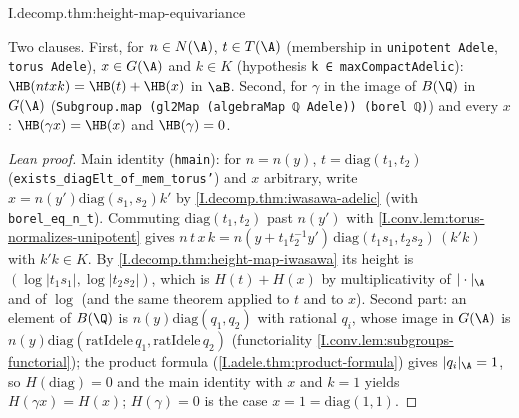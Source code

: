 \begin{theorem}
\end{theorem}
\begin{tfformal}{I.decomp.thm:height-map-equivariance}
\begin{tffidelity}
Two clauses. First, for $n\in N(\A)$, $t\in T(\A)$ (membership in \texttt{unipotent Adele}, \texttt{torus Adele}), $x\in G(\A)$ and $k\in K$ (hypothesis \texttt{k ∈ maxCompactAdelic}): $\HB(ntxk)=\HB(t)+\HB(x)$ in $\aB$. Second, for $\gamma$ in the image of $B(\Q)$ in $G(\A)$ (\texttt{Subgroup.map (gl2Map (algebraMap ℚ Adele)) (borel ℚ)}) and every $x$: $\HB(\gamma x)=\HB(x)$ and $\HB(\gamma)=0$.
\end{tffidelity}
\end{tfformal}
\begin{proof}[Lean proof]
Main identity (\texttt{hmain}): for $n=n(y)$, $t=\mathrm{diag}(t_1,t_2)$ (\texttt{exists\_diagElt\_of\_mem\_torus'}) and $x$ arbitrary, write $x=n(y')\mathrm{diag}(s_1,s_2)k'$ by \cref{I.decomp.thm:iwasawa-adelic} (with \texttt{borel\_eq\_n\_t}). Commuting $\mathrm{diag}(t_1,t_2)$ past $n(y')$ with \cref{I.conv.lem:torus-normalizes-unipotent} gives $n\,t\,x\,k=n(y+t_1t_2^{-1}y')\,\mathrm{diag}(t_1s_1,t_2s_2)\,(k'k)$ with $k'k\in K$. By \cref{I.decomp.thm:height-map-iwasawa} its height is $(\log|t_1s_1|,\log|t_2s_2|)$, which is $H(t)+H(x)$ by multiplicativity of $|\cdot|_\A$ and of $\log$ (and the same theorem applied to $t$ and to $x$). Second part: an element of $B(\Q)$ is $n(y)\mathrm{diag}(q_1,q_2)$ with rational $q_i$, whose image in $G(\A)$ is $n(y)\mathrm{diag}(\mathrm{ratIdele}\,q_1,\mathrm{ratIdele}\,q_2)$ (functoriality \cref{I.conv.lem:subgroups-functorial}); the product formula (\cref{I.adele.thm:product-formula}) gives $|q_i|_\A=1$, so $H(\mathrm{diag})=0$ and the main identity with $x$ and $k=1$ yields $H(\gamma x)=H(x)$; $H(\gamma)=0$ is the case $x=1=\mathrm{diag}(1,1)$.
\end{proof}


